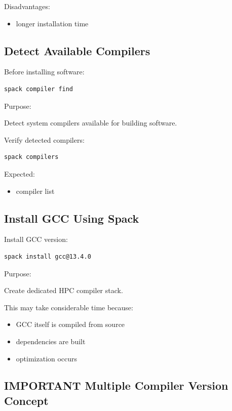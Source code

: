 \documentclass[11pt]{article}
\begin{document}
Disadvantages:

\begin{itemize}
\item longer installation time
\end{itemize}
\subsection{Detect Available Compilers}
\label{sec:org3bef4ea}

Before installing software:

\begin{verbatim}
spack compiler find
\end{verbatim}

Purpose:

Detect system compilers available for building software.

Verify detected compilers:

\begin{verbatim}
spack compilers
\end{verbatim}

Expected:
\begin{itemize}
\item compiler list
\end{itemize}
\subsection{Install GCC Using Spack}
\label{sec:org902ab69}

Install GCC version:

\begin{verbatim}
spack install gcc@13.4.0
\end{verbatim}

Purpose:

Create dedicated HPC compiler stack.

This may take considerable time because:

\begin{itemize}
\item GCC itself is compiled from source
\item dependencies are built
\item optimization occurs
\end{itemize}
\subsection{IMPORTANT Multiple Compiler Version Concept}
\label{sec:orgc928bd5}
\end{document}

